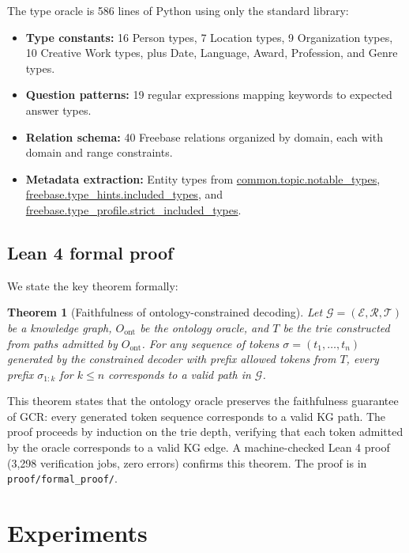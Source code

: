 \documentclass[11pt,twoside]{article}
\newtheorem{theorem}{Theorem}[section]
\begin{document}
The type oracle is 586 lines of Python using only the standard library:

\begin{itemize}
	\item \textbf{Type constants:} 16 Person types, 7 Location types, 9 Organization types, 10 Creative Work types, plus Date, Language, Award, Profession, and Genre types.
	\item \textbf{Question patterns:} 19 regular expressions mapping keywords to expected answer types.
	\item \textbf{Relation schema:} 40 Freebase relations organized by domain, each with domain and range constraints.
	\item \textbf{Metadata extraction:} Entity types from \url{common.topic.notable_types}, \url{freebase.type_hints.included_types}, and \url{freebase.type_profile.strict_included_types}.
\end{itemize}

\subsection{Lean 4 formal proof}

We state the key theorem formally:

\begin{theorem}[Faithfulness of ontology-constrained decoding]
\label{thm:faithfulness}
Let \(\mathcal{G} = (\mathcal{E}, \mathcal{R}, \mathcal{T})\) be a knowledge graph, \(O_{\text{ont}}\) be the ontology oracle, and \(T\) be the trie constructed from paths admitted by \(O_{\text{ont}}\). For any sequence of tokens \(\sigma = (t_1, \ldots, t_n)\) generated by the constrained decoder with prefix allowed tokens from \(T\), every prefix \(\sigma_{1:k}\) for \(k \leq n\) corresponds to a valid path in \(\mathcal{G}\).
\end{theorem}

\noindent This theorem states that the ontology oracle preserves the faithfulness guarantee of GCR: every generated token sequence corresponds to a valid KG path. The proof proceeds by induction on the trie depth, verifying that each token admitted by the oracle corresponds to a valid KG edge. A machine-checked Lean 4 proof (3,298 verification jobs, zero errors) confirms this theorem. The proof is in \texttt{proof/formal\_proof/}.

\section{Experiments}
\label{sec:experiments}
\end{document}
